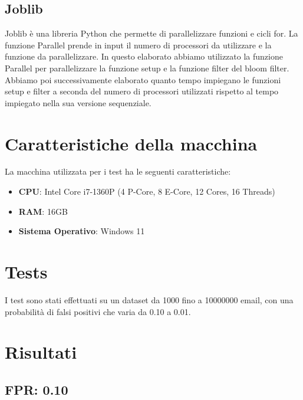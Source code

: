 \documentclass[11pt]{article}
\begin{document}
    \subsection{Joblib}\label{subsec:joblib}
    Joblib è una libreria Python che permette di parallelizzare funzioni e cicli for.
    La funzione Parallel prende in input il numero di processori da utilizzare e la funzione da parallelizzare.
    In questo elaborato abbiamo utilizzato la funzione Parallel per parallelizzare la funzione setup e la funzione
    filter del bloom filter.
    Abbiamo poi successivamente elaborato quanto tempo impiegano le funzioni setup e filter a seconda del numero di
    processori utilizzati rispetto al tempo impiegato nella sua versione sequenziale.
    
    

    \section{Caratteristiche della macchina}\label{sec:caratteristiche-della-macchina}
    La macchina utilizzata per i test ha le seguenti caratteristiche:
    \begin{itemize}
        \item \textbf{CPU}: Intel Core i7-1360P (4 P-Core, 8 E-Core, 12 Cores, 16 Threads)
        \item \textbf{RAM}: 16GB
        \item \textbf{Sistema Operativo}: Windows 11
    \end{itemize}

    \section{Tests}\label{sec:tests}
    I test sono stati effettuati su un dataset da 1000 fino a 10000000 email, con una probabilità di falsi positivi che
    varia da 0.10 a 0.01.

    \section{Risultati}\label{sec:risultati}
    \subsection{FPR: 0.10}\label{subsec:fpr-010}
\end{document}
